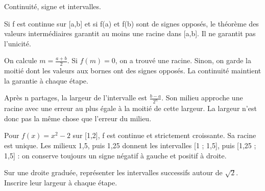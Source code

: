 \documentclass[11pt]{article}
\begin{document}
Continuité, signe et intervalles.\par
{}
Si f est continue sur [a,b] et si f(a) et f(b) sont de signes opposés, le théorème des valeurs intermédiaires garantit au moins une racine dans [a,b]. Il ne garantit pas l’unicité.\par
On calcule \(m=\frac{a+b}{2}\). Si \(f(m)=0\), on a trouvé une racine. Sinon, on garde la moitié dont les valeurs aux bornes ont des signes opposés. La continuité maintient la garantie à chaque étape.\par
Après n partages, la largeur de l’intervalle est \(\frac{b-a}{2^{n}}\). Son milieu approche une racine avec une erreur au plus égale à la moitié de cette largeur. La largeur n’est donc pas la même chose que l’erreur du milieu.\par
{}
Pour \(f(x)=x^{2}-2\) sur [1,2], f est continue et strictement croissante. Sa racine est unique. Les milieux 1,5, puis 1,25 donnent les intervalles [1 ; 1,5], puis [1,25 ; 1,5] : on conserve toujours un signe négatif à gauche et positif à droite.\par
{}
Sur une droite graduée, représenter les intervalles successifs autour de \(\sqrt{2}\). Inscrire leur largeur à chaque étape.\par
\end{document}
